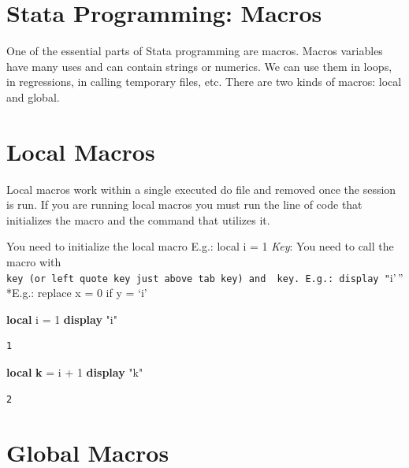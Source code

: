 \documentclass[
]{book}
\newenvironment{Shaded}{\begin{snugshade}}{\end{snugshade}}
\newcommand{\KeywordTok}[1]{\textcolor[rgb]{0.13,0.29,0.53}{\textbf{#1}}}
\newcommand{\NormalTok}[1]{#1}
\newcommand{\OtherTok}[1]{\textcolor[rgb]{0.56,0.35,0.01}{#1}}
\newcommand{\StringTok}[1]{\textcolor[rgb]{0.31,0.60,0.02}{#1}}
\begin{document}
\section{Stata Programming: Macros}\label{stata-programming-macros}

One of the essential parts of Stata programming are macros. Macros variables have many uses and can contain strings or numerics. We can use them in loops, in regressions, in calling temporary files, etc. There are two kinds of macros: local and global.

\section{Local Macros}\label{local-macros}

Local macros work within a single executed do file and removed once the session is run. If you are running local macros you must run the line of code that initializes the macro and the command that utilizes it.

You need to initialize the local macro
E.g.: local i = 1
\emph{Key}: You need to call the macro with \texttt{key\ (or\ left\ quote\ key\ just\ above\ tab\ key)\ and\ \textquotesingle{}\ key.\ E.g.:\ display\ "}i'\,''
*E.g.: replace x = 0 if y = `i'

\begin{Shaded}
\begin{Highlighting}[]
\KeywordTok{local}\NormalTok{ i = 1}
\KeywordTok{display} \StringTok{"\textasciigrave{}i\textquotesingle{}"}
\end{Highlighting}
\end{Shaded}

\begin{verbatim}
1
\end{verbatim}

\begin{Shaded}
\begin{Highlighting}[]
\KeywordTok{local} \KeywordTok{k}\NormalTok{ = }\OtherTok{\textasciigrave{}i\textquotesingle{}}\NormalTok{ + 1}
\KeywordTok{display} \StringTok{"\textasciigrave{}k\textquotesingle{}"}
\end{Highlighting}
\end{Shaded}

\begin{verbatim}
2
\end{verbatim}

\section{Global Macros}\label{global-macros}
\end{document}
